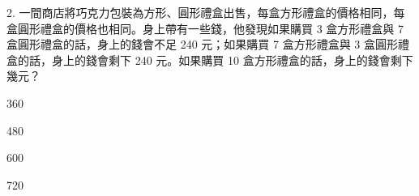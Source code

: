 \documentclass[12pt]{article}
\begin{document}
\begin{problem}
  \item[2.] 一間商店將巧克力包裝為方形、圓形禮盒出售，每盒方形禮盒的價格相同，每盒圓形禮盒的價格也相同。身上帶有一些錢，他發現如果購買 3 盒方形禮盒與 7 盒圓形禮盒的話，身上的錢會不足 240 元；如果購買 7 盒方形禮盒與 3 盒圓形禮盒的話，身上的錢會剩下 240 元。如果購買 10 盒方形禮盒的話，身上的錢會剩下幾元？
  \begin{choices}
    \item 360
    \item 480
    \item 600
    \item 720
  \end{choices}
\end{problem}
\end{document}
